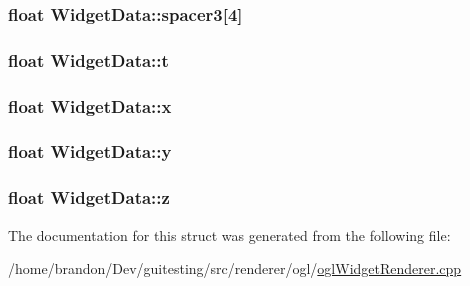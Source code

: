 \hypertarget{struct_widget_data_3bb714da098f37055f6d1fbc3926a85b}{
\subsubsection[{spacer3}]{\setlength{\rightskip}{0pt plus 5cm}float {\bf WidgetData::spacer3}\mbox{[}4\mbox{]}}}
\label{struct_widget_data_3bb714da098f37055f6d1fbc3926a85b}


\hypertarget{struct_widget_data_c0b9197fbae2e0b4233126328f519a9f}{
\subsubsection[{t}]{\setlength{\rightskip}{0pt plus 5cm}float {\bf WidgetData::t}}}
\label{struct_widget_data_c0b9197fbae2e0b4233126328f519a9f}


\hypertarget{struct_widget_data_27f4a7fb857088802a0098b436a50a47}{
\subsubsection[{x}]{\setlength{\rightskip}{0pt plus 5cm}float {\bf WidgetData::x}}}
\label{struct_widget_data_27f4a7fb857088802a0098b436a50a47}


\hypertarget{struct_widget_data_8898221a2196e0fdfeac3afa3e9afef9}{
\subsubsection[{y}]{\setlength{\rightskip}{0pt plus 5cm}float {\bf WidgetData::y}}}
\label{struct_widget_data_8898221a2196e0fdfeac3afa3e9afef9}


\hypertarget{struct_widget_data_baed207ae9d6f8915bb5a896e9771069}{
\subsubsection[{z}]{\setlength{\rightskip}{0pt plus 5cm}float {\bf WidgetData::z}}}
\label{struct_widget_data_baed207ae9d6f8915bb5a896e9771069}




The documentation for this struct was generated from the following file:\begin{CompactItemize}
\item 
/home/brandon/Dev/guitesting/src/renderer/ogl/\hyperlink{ogl_widget_renderer_8cpp}{oglWidgetRenderer.cpp}\end{CompactItemize}
